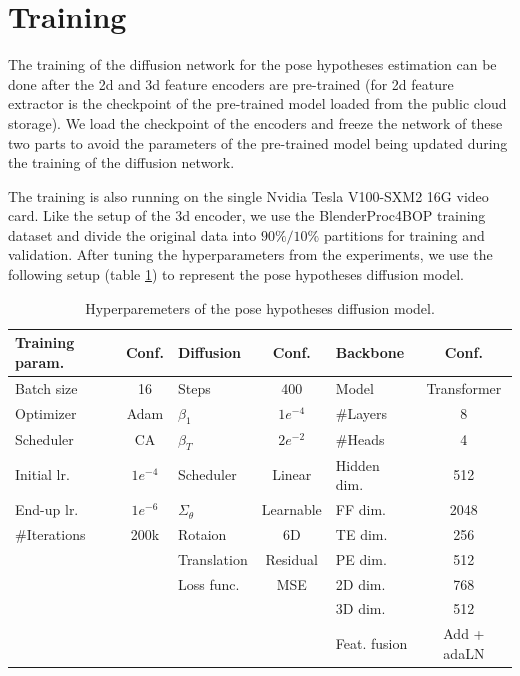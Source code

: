 \documentclass[12pt,DIV14,BCOR12mm,a4paper,footinclude=false,headinclude,parskip=half-,twoside,openright,cleardoublepage=empty,toc=index,bibliography=totoc,listof=totoc]{scrreprt}
\numberwithin{equation}{chapter}
\begin{document}
\section{Training} 
The training of the diffusion network for the pose hypotheses estimation can be done after the \gls{2d} and \gls{3d} feature encoders are pre-trained (for \gls{2d} feature extractor is the checkpoint of the pre-trained model loaded from the public cloud storage). We load the checkpoint of the encoders and freeze the network of these two parts to avoid the parameters of the pre-trained model being updated during the training of the diffusion network. 

The training is also running on the single Nvidia Tesla V100-SXM2 16G video card. Like the setup of the \gls{3d} encoder, we use the BlenderProc4BOP training dataset and divide the original data into $90\%/10\%$ partitions for training and validation. After tuning the hyperparameters from the experiments, we use the following setup (table \ref{tab:hyper}) to represent the pose hypotheses diffusion model.
\begin{table}[h]
  \centering
  \caption{Hyperparemeters of the pose hypotheses diffusion model.}
  \label{tab:hyper}
  \begin{tabular}{l c | l c | l c}
      \toprule
      Training param. & Conf. & Diffusion & Conf. & Backbone & Conf.\\
      \midrule
      Batch size & 16 & Steps & 400 & Model & Transformer\\
      Optimizer & Adam & $\beta_{1}$ & $1e^{-4}$ & \#Layers & 8\\
      Scheduler & CA & $\beta_{T}$ & $2e^{-2}$ & \#Heads & 4\\
      Initial lr. & $1e^{-4}$ & Scheduler & Linear & Hidden dim. & 512\\
      End-up lr. & $1e^{-6}$ & $\Sigma_{\theta}$ & Learnable & FF dim. & 2048\\
      \#Iterations & 200k & Rotaion & 6D & TE dim. & 256\\
       &  & Translation & Residual & PE dim. & 512\\
       &  & Loss func. & MSE & 2D dim. & 768\\
       &  & & & 3D dim. & 512\\
       &  & & & Feat. fusion & Add + adaLN\\
      \bottomrule
  \end{tabular}
\end{table}
\end{document}
